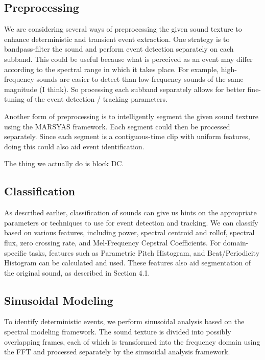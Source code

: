 \documentclass{acmsiggraph}               %
\begin{document}
\subsection{Preprocessing}

We are considering several ways of preprocessing the given sound 
texture to enhance deterministic and transient event extraction. One strategy is to bandpass-filter 
the sound and perform event detection separately on each subband. This 
could be useful because what is perceived as an event may differ according 
to the spectral range in which it takes place. For example, high-frequency
sounds
are easier to detect than low-frequency sounds of 
the same magnitude (I think). So processing each subband separately allows 
for better fine-tuning of the event detection / tracking parameters.

Another form of preprocessing is to intelligently segment the given sound 
texture using the MARSYAS framework. Each segment could then be processed 
separately. Since each segment is a contiguous-time clip with uniform 
features, doing this could also aid event identification.

The thing we actually do is block DC.

\subsection{Classification}

As described earlier, classification of sounds can give us hints on the 
appropriate parameters or techniques to use for event detection and 
tracking. We can classify based on various features, including power, spectral centroid and 
rollof, spectral flux, zero crossing rate, and Mel-Frequency Cepstral Coefficients. For 
domain-specific tasks, features such as Parametric Pitch Histogram, and Beat/Periodicity 
Histogram can be calculated and used. These features also aid segmentation of the original 
sound, as described in Section 4.1.

\subsection{Sinusoidal Modeling}

To identify deterministic events, we perform sinusoidal analysis based on the spectral 
modeling framework. The sound texture is divided into possibly overlapping 
frames, each of which is transformed into the frequency domain using the 
FFT and processed separately by the sinusoidal analysis framework.
\end{document}
